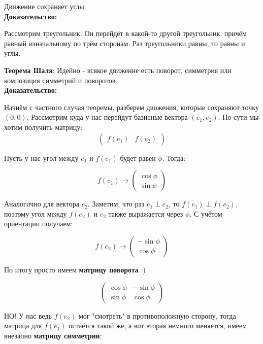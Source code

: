 \documentclass[12pt]{article}
\begin{document}
\begin{theorembox}
    Движение сохраняет углы.\\

    \textbf{Доказательство:}

    Рассмотрим треугольник. Он перейдёт в какой-то другой треугольник, причём равный изначальному по трём сторонам. Раз треугольники равны, то равны и углы.
\end{theorembox}

\begin{theorembox}
    \textbf{Теорема Шаля}: Идейно - всякое движение есть поворот, симметрия или композиция симметрий и поворотов.\\

    \textbf{Доказательство:}

    Начнём с частного случая теоремы, разберем движения, которые сохраняют точку $(0, 0)$. Рассмотрим куда у нас перейдут базисные вектора $(e_1, e_2)$. По сути мы хотим получить матрицу:
    \[
        \begin{pmatrix}
            f(e_1) & f(e_2)
        \end{pmatrix}
    \]

    Пусть у нас угол между $e_1$ и $f(e_1)$ будет равен $\phi$. Тогда:

    \[
        f(e_1) \rightarrow
        \begin{pmatrix}
            \cos{\phi}\\
            \sin{\phi}
        \end{pmatrix}
    \]

    Аналогично для вектора $e_2$. Заметим, что раз $e_1 \perp e_2$, то $f(e_1) \perp f(e_2)$, поэтому угол между $f(e_2)$ и $e_2$ также выражается через $\phi$. С учётом ориентации получаем:

    \[
        f(e_2) \rightarrow
        \begin{pmatrix}
            -\sin{\phi}\\
            \cos{\phi}
        \end{pmatrix}
    \]

    По итогу просто имеем \textbf{матрицу поворота} :)

    \[
        \begin{pmatrix}
            \cos{\phi} & -\sin{\phi}\\
            \sin{\phi} & \cos{\phi}
        \end{pmatrix}
    \]

    НО! У нас ведь $f(e_2)$ мог "смотреть" в противоположную сторону, тогда матрица для $f(e_1)$ остаётся такой же, а вот вторая немного меняется, имеем внезапно \textbf{матрицу симметрии}:


\end{theorembox}
\end{document}

